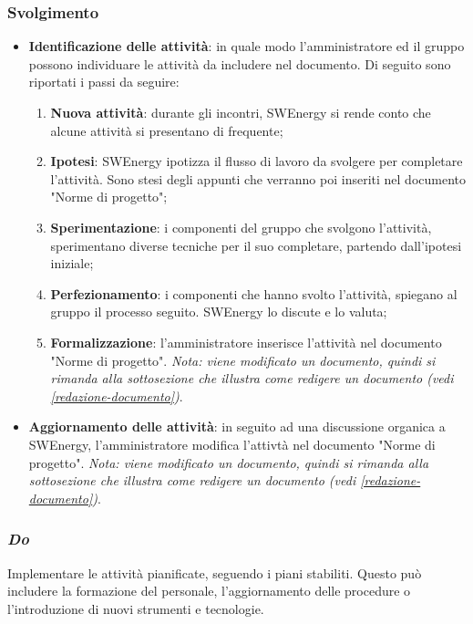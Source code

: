 \subsubsection*{Svolgimento}
\begin{itemize}
	\item \textbf{Identificazione delle attività}: in quale modo
		l'amministratore ed il gruppo possono individuare le attività da
		includere nel documento. Di seguito sono riportati i passi da
		seguire:
		\begin{enumerate}
			\item \textbf{Nuova attività}: durante gli incontri,
					SWEnergy si rende conto che alcune attività si
					presentano di frequente;

			\item \textbf{Ipotesi}: SWEnergy ipotizza il flusso di lavoro da
					svolgere per completare l'attività. Sono stesi degli appunti
					che verranno poi inseriti nel documento "Norme di progetto";

			\item \textbf{Sperimentazione}: i componenti del gruppo che
					svolgono l'attività, sperimentano diverse tecniche per
					il suo completare, partendo dall'ipotesi iniziale;

			\item \textbf{Perfezionamento}: i componenti che hanno
					svolto l'attività, spiegano al gruppo il processo
					seguito. SWEnergy lo discute e lo valuta;

			\item \textbf{Formalizzazione}: l'amministratore inserisce
					l'attività nel documento "Norme di progetto". \textit{Nota:
					viene modificato un documento, quindi si rimanda alla
					sottosezione che illustra come redigere un documento
					(vedi \cref{redazione-documento})}.
		\end{enumerate}

	\item \textbf{Aggiornamento delle attività}: in seguito ad una discussione
		organica a SWEnergy, l'amministratore modifica l'attivtà
		nel documento "Norme di progetto". \textit{Nota:
		viene modificato un documento, quindi si rimanda alla
		sottosezione che illustra come redigere un documento
		(vedi \cref{redazione-documento})}.
\end{itemize}
	  




\subsubsection{\textit{Do}}
	  Implementare le attività pianificate, seguendo i piani stabiliti.
	  Questo può includere la formazione del personale, l'aggiornamento
	  delle procedure o l'introduzione di nuovi strumenti e tecnologie.

